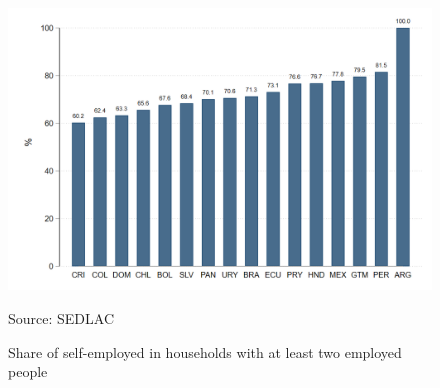 \documentclass[english]{article}
\begin{document}
\begin{figure}[H]
            \justifying
                \caption{Share of self-employed in households with at least two employed people}  
            \centerline{\includegraphics[scale=.3]{latex/figures/Self-employed/se_en_hogar_con_dos_o_mas.png}}
                \label{fig:se-two}
                \footnotesize{Source: SEDLAC}
\end{figure}
\end{document}
